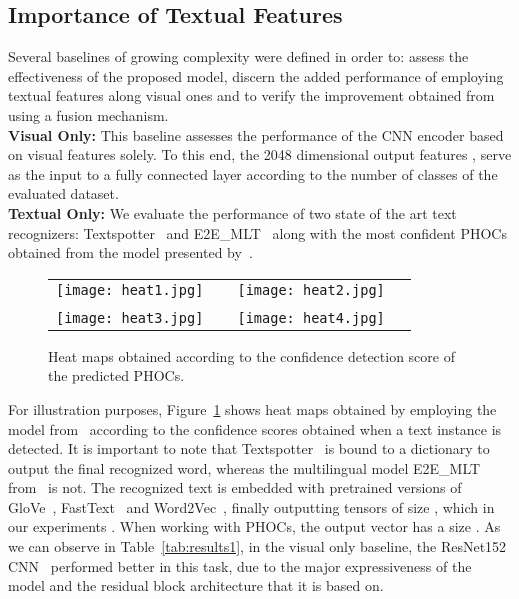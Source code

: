 \documentclass[10pt,twocolumn,letterpaper]{article}
\begin{document}
\subsection{Importance of Textual Features}
Several baselines of growing complexity were defined in order to: assess the effectiveness of the proposed model, discern the added performance of employing textual features along visual ones and to verify the improvement obtained from using a fusion mechanism.\\
\textbf{Visual Only:} This baseline assesses the performance of the CNN encoder based on visual features solely. To this end, the 2048 dimensional output features , serve as the input to a fully connected layer according to the number of classes of the evaluated dataset.\\
\textbf{Textual Only:} We evaluate the performance of two state of the art text recognizers: Textspotter~\cite{he2018end} and E2E\_MLT~\cite{buvsta2018e2e} along with the most confident PHOCs obtained from the model presented by~\cite{Gomez_2018_ECCV}. 
\begin{figure}[ht]
\begin{center}
\begin{tabular}{p{0.45\linewidth} p{0.45\linewidth}}
    \texttt{[image: heat1.jpg]}  &
    \texttt{[image: heat2.jpg]} 
    \\
    & \\
    \texttt{[image: heat3.jpg]} 
    & 
    \texttt{[image: heat4.jpg]}
\end{tabular}
\end{center}
\caption{Heat maps obtained according to the confidence detection score of the predicted PHOCs.}
\label{fig:heatmaps}
\end{figure}
For illustration purposes, Figure~\ref{fig:heatmaps} shows heat maps obtained by employing the model from~\cite{Gomez_2018_ECCV} according to the confidence scores obtained when a text instance is detected. It is important to note that Textspotter~\cite{he2018end} is bound to a dictionary to output the final recognized word, whereas the multilingual model E2E\_MLT  from~\cite{buvsta2018e2e} is not.
The recognized text is embedded with pretrained versions of GloVe~\cite{pennington2014glove}, FastText~\cite{bojanowski2017enriching} and Word2Vec~\cite{mikolov2013distributed}, finally outputting tensors of size , which in our experiments . When working with PHOCs, the output vector has a size .
As we can observe in Table~\ref{tab:results1}, in the visual only baseline, the ResNet152 CNN~\cite{he2016deep} performed better in this task, due to the major expressiveness of the model and the residual block architecture that it is based on. 
\end{document}
